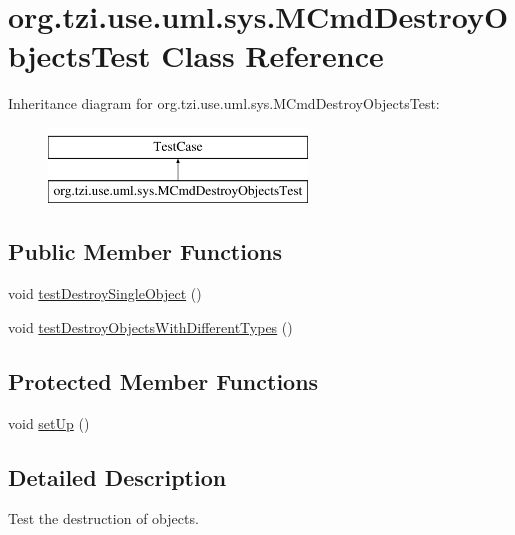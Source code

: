 \hypertarget{classorg_1_1tzi_1_1use_1_1uml_1_1sys_1_1_m_cmd_destroy_objects_test}{\section{org.\-tzi.\-use.\-uml.\-sys.\-M\-Cmd\-Destroy\-Objects\-Test Class Reference}
\label{classorg_1_1tzi_1_1use_1_1uml_1_1sys_1_1_m_cmd_destroy_objects_test}
}
Inheritance diagram for org.\-tzi.\-use.\-uml.\-sys.\-M\-Cmd\-Destroy\-Objects\-Test\-:\begin{figure}[H]
\begin{center}
\leavevmode
\includegraphics[height=2.000000cm]{classorg_1_1tzi_1_1use_1_1uml_1_1sys_1_1_m_cmd_destroy_objects_test}
\end{center}
\end{figure}
\subsection*{Public Member Functions}
\begin{DoxyCompactItemize}
\item 
void \hyperlink{classorg_1_1tzi_1_1use_1_1uml_1_1sys_1_1_m_cmd_destroy_objects_test_a70446d185001a63729ca6876facc6bc5}{test\-Destroy\-Single\-Object} ()
\item 
void \hyperlink{classorg_1_1tzi_1_1use_1_1uml_1_1sys_1_1_m_cmd_destroy_objects_test_abdea169e8c2916466acf5f553a17b90a}{test\-Destroy\-Objects\-With\-Different\-Types} ()
\end{DoxyCompactItemize}
\subsection*{Protected Member Functions}
\begin{DoxyCompactItemize}
\item 
void \hyperlink{classorg_1_1tzi_1_1use_1_1uml_1_1sys_1_1_m_cmd_destroy_objects_test_aeb3e1db53c320f0b94bd55a332bddf82}{set\-Up} ()
\end{DoxyCompactItemize}


\subsection{Detailed Description}
Test the destruction of objects.

